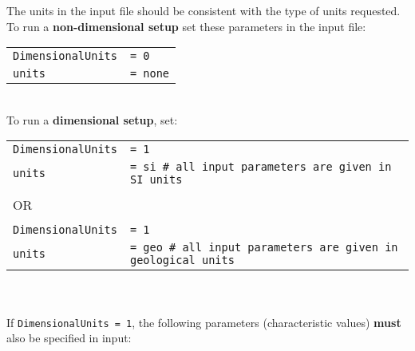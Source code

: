 \documentclass[a4paper,11pt]{article}
\begin{document}
The units in the input file should be consistent with the type of units requested. \\

To run a \textbf{non-dimensional setup} set these parameters in the input file:\\
\begin{tabular}{l l}
\indent \texttt{DimensionalUnits} &\texttt{= 0} \\
\indent \texttt{units} &\texttt{= none} \\
\end{tabular}
\\

To run a \textbf{dimensional setup}, set:\\
\begin{tabular}{l l}
\indent \texttt{DimensionalUnits} &\texttt{= 1} \\
\indent \texttt{units} &\texttt{= si  \# all input parameters are given in SI units}\\
&\\
\indent OR&\\
&\\
\indent \texttt{DimensionalUnits} &\texttt{= 1} \\
\indent \texttt{units} &\texttt{= geo  \# all input parameters are given in geological units}\\ 
\end{tabular}\\
\\
If \texttt{DimensionalUnits = 1}, the following parameters (characteristic values) \textbf{must} also be specified in input:
\end{document}
